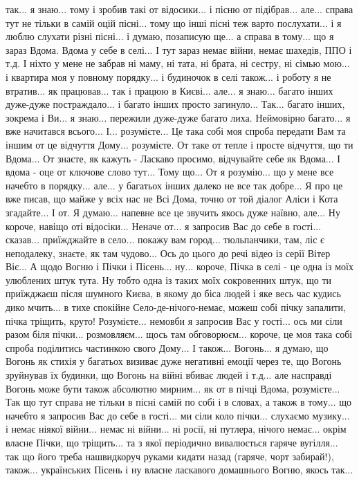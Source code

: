 так... я знаю... тому і зробив такі от відосики... і пісню от підібрав...
але... справа тут не тільки в самій оцій пісні... тому що інші пісні теж варто
послухати... і я люблю слухати різні пісні... і думаю, позаписую ще... а справа
в тому... що я зараз Вдома. Вдома у себе в селі... І тут зараз немає війни,
немає шахедів, ППО і т.д. І ніхто у мене не забрав ні маму, ні тата, ні брата,
ні сестру, ні сімью мою... і квартира моя у повному порядку... і будиночок в
селі також... і роботу я не втратив... як працював... так і працюю в Києві...
але... я знаю... багато інших дуже-дуже постраждало... і багато інших просто
загинуло... Так... багато інших, зокрема і Ви... я знаю... пережили дуже-дуже
багато лиха. Неймовірно багато... я вже начитався всього... І... розумієте...
Це така собі моя спроба передати Вам та іншим от це відчуття Дому... розумієте.
От таке от тепле і просте відчуття, що ти Вдома... От знаєте, як кажуть -
Ласкаво просимо, відчувайте себе як Вдома... І вдома - оце от ключове слово
тут... Тому що... От я розумію... що у мене все начебто в порядку... але... у
багатьох інших далеко не все так добре... Я про це вже писав, що майже у всіх
нас не Всі Дома, точно от той діалог Аліси і Кота згадайте... І от. Я думаю...
напевне все це звучить якось дуже наївно, але... Ну короче, навіщо оті
відосіки... Неначе от... я запросив Вас до себе в гості... сказав...
приїжджайте в село... покажу вам город... тюльпанчики, там, ліс є неподалеку,
знаєте, як там чудово... Ось до цього до речі відео із серії Вітер Віє... А
щодо Вогню і Пічки і Пісень... ну... короче, Пічка в селі - це одна із моїх
улюблених штук тута. Ну тобто одна із таких моїх сокровенних штук, що ти
приїжджаєш після шумного Києва, в якому до біса людей і яке весь час кудись
дико мчить... в тихе спокійне Село-де-нічого-немає, можеш собі пічку запалити,
пічка тріщить, круто! Розумієте... немовби я запросив Вас у гості... ось ми
сіли разом біля пічки... розмовляєм... щось там обговорюєм... короче, це моя
така собі спроба поділитись частинкою свого Дому... І також... Вогонь... я
думаю, що Вогонь як стихія у багатьох визиває дуже негативні емоції через те,
що Вогонь зруйнував їх будинки, що Вогонь на війні вбиває людей і т.д... але
насправді Вогонь може бути також абсолютно мирним... як от в пічці Вдома,
розумієте... Так що тут справа не тільки в пісні самій по собі і в словах, а
також в тому... що начебто я запросив Вас до себе в гості... ми сіли коло
пічки... слухаємо музику... і немає ніякої війни... немає ні війни... ні росії,
ні путлера, нічого немає... окрім власне Пічки, що тріщить... та з якої
періодично вивалюється гаряче вугілля... так що його треба нашвидкоруч руками
кидати назад (гаряче, чорт забирай!), також... українських Пісень і ну власне
ласкавого домашнього Вогню, якось так...
